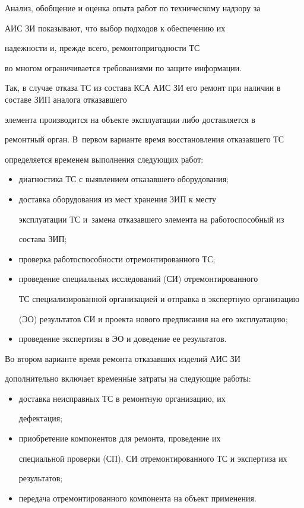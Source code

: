      Анализ, обобщение и оценка опыта работ по техническому надзору за

АИС ЗИ показывают, что выбор подходов к обеспечению их

надежности и, прежде всего, ремонтопригодности ТС

во многом ограничивается требованиями по защите информации.



     Так, в случае отказа ТС из состава КСА АИС ЗИ его ремонт при наличии в составе ЗИП аналога отказавшего

элемента производится на объекте эксплуатации либо доставляется в

ремонтный орган. В~первом варианте время восстановления отказавшего ТС

определяется временем выполнения следующих работ:

     \begin{itemize}

     \item диагностика ТС с выявлением отказавшего оборудования;

     \item доставка оборудования из мест хранения ЗИП к месту

эксплуатации ТС и~замена отказавшего элемента на работоспособный из

состава ЗИП;

     \item проверка работоспособности отремонтированного ТС;

     \item проведение специальных исследований (СИ) отремонтированного

ТС специализированной организацией и отправка в экспертную организацию

(ЭО) результатов СИ и проекта нового предписания на его эксплуатацию;

     \item проведение экспертизы в ЭО и доведение ее результатов.

     \end{itemize}



     Во втором варианте время ремонта отказавших изделий АИС ЗИ

дополнительно включает временн$\acute{\mbox{ы}}$е затраты на следующие работы:

     \begin{itemize}

     \item  доставка неисправных ТС в ремонтную организацию, их

дефектация;

     \item приобретение компонентов для ремонта, проведение их

специальной проверки (СП), СИ отремонтированного ТС и экспертиза их

результатов;

     \item передача отремонтированного компонента на объект применения.

     \end{itemize}



